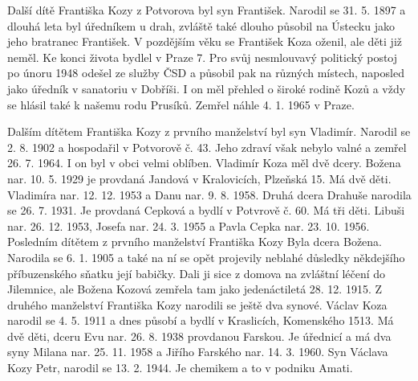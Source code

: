 \documentclass[../dejiny-rodu-prusiku.tex]{subfiles}
\begin{document}
Další dítě Františka Kozy z Potvorova byl syn František. Narodil se 31. 5. 1897 a dlouhá leta byl úředníkem u drah, zvláště také dlouho působil na Ústecku jako jeho bratranec František. V pozdějším věku se František Koza oženil, ale děti již neměl. Ke konci života bydlel v Praze 7. Pro svůj nesmlouvavý politický postoj po únoru 1948 odešel ze služby ČSD a působil pak na různých místech, naposled jako úředník v sanatoriu v Dobříši. I on měl přehled o široké rodině Kozů a vždy se hlásil také k našemu rodu Prusíků. Zemřel náhle 4. 1. 1965 v Praze.

Dalším dítětem Františka Kozy z prvního manželství byl syn Vladimír. Narodil se 2. 8. 1902 a hospodařil v Potvorově č. 43. Jeho zdraví však nebylo valné a zemřel 26. 7. 1964. I on byl v obci velmi oblíben. Vladimír Koza měl dvě dcery. Božena nar. 10. 5. 1929 je provdaná Jandová v Kralovicích, Plzeňská 15. Má dvě děti. Vladimíra nar. 12. 12. 1953 a Danu nar. 9. 8. 1958. Druhá dcera Drahuše narodila se 26. 7. 1931. Je provdaná Cepková a bydlí v Potvrově č. 60. Má tři děti. Libuši nar. 26. 12. 1953, Josefa nar. 24. 3. 1955 a Pavla Cepka nar. 23. 10. 1956. Posledním dítětem z prvního manželství Františka Kozy Byla dcera Božena. Narodila se 6. 1. 1905 a také na ní se opět projevily neblahé důsledky někdejšího příbuzenského
sňatku její babičky. Dali ji sice z domova na zvláštní léčení do Jilemnice, ale Božena Kozová zemřela tam jako jedenáctiletá 28. 12. 1915. Z druhého manželství Františka Kozy narodili se ještě dva synové. Václav Koza narodil se 4. 5. 1911 a dnes působí a bydlí v Kraslicích, Komenského 1513. Má dvě děti, dceru Evu nar. 26. 8. 1938 provdanou Farskou. Je úřednicí a má dva syny Milana nar. 25. 11. 1958 a Jiřího Farského nar. 14. 3. 1960. Syn Václava Kozy Petr, narodil se 13. 2. 1944. Je chemikem a to v podniku Amati.
\end{document}
